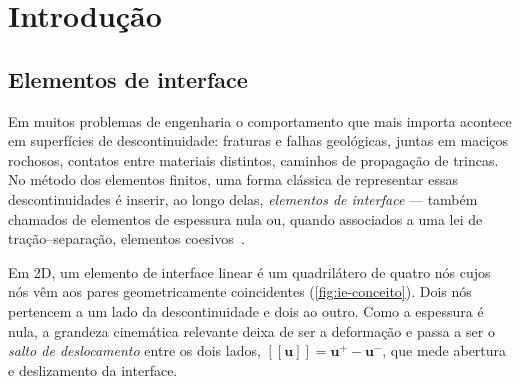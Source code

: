 \section{Introdução}
\label{sec:intro}

\subsection{Elementos de interface}

Em muitos problemas de engenharia o comportamento que mais importa acontece em superfícies de descontinuidade:
fraturas e falhas geológicas, juntas em maciços rochosos, contatos entre materiais distintos, caminhos de propagação de
trincas. No método dos elementos finitos, uma forma clássica de representar essas descontinuidades é inserir, ao longo
delas, \emph{elementos de interface} --- também chamados de elementos de espessura nula ou, quando associados a uma lei
de tração--separação, elementos coesivos~\cite{paulino}.

Em 2D, um elemento de interface linear é um quadrilátero de quatro nós cujos nós vêm aos pares geometricamente
coincidentes (\cref{fig:ie-conceito}). Dois nós pertencem a um lado da descontinuidade e dois ao outro. Como a espessura
é nula, a grandeza cinemática relevante deixa de ser a deformação e passa a ser o \emph{salto de deslocamento} entre os
dois lados, $[\![\mathbf{u}]\!] = \mathbf{u}^{+} - \mathbf{u}^{-}$, que mede abertura e deslizamento da interface.

